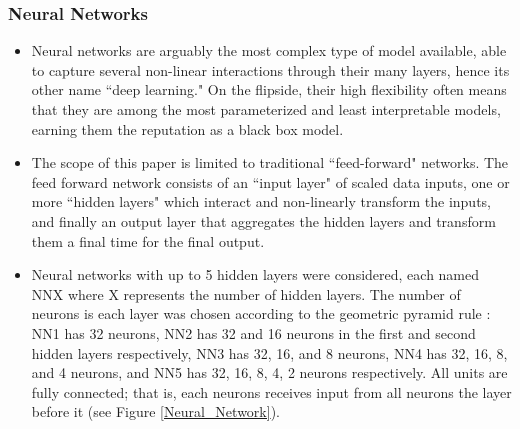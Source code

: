 \documentclass{beamer}
\begin{document}
\begin{frame}
\frametitle{Neural Networks}
\begin{itemize}
\item Neural networks are arguably the most complex type of model available, able to capture several non-linear interactions through their many layers, hence its other name ``deep learning." On the flipside, their high flexibility often means that they are among the most parameterized and least interpretable models, earning them the reputation as a black box model.

\item The scope of this paper is limited to traditional ``feed-forward" networks. The feed forward network consists of an ``input layer" of scaled data inputs, one or more ``hidden layers" which interact and non-linearly transform the inputs, and finally an output layer that aggregates the hidden layers and transform them a final time for the final output. 

\item Neural networks with up to 5 hidden layers were considered, each named NNX where X represents the number of hidden layers. The number of neurons is each layer was chosen according to the geometric pyramid rule \citep{masters_practical_1993}: NN1 has 32 neurons, NN2 has 32 and 16 neurons in the first and second hidden layers respectively, NN3 has 32, 16, and 8 neurons, NN4 has 32, 16, 8, and 4 neurons, and NN5 has 32, 16, 8, 4, 2 neurons respectively. All units are fully connected; that is, each neurons receives input from all neurons the layer before it (see Figure \ref{Neural_Network}).
\end{itemize}
\end{frame}
\end{document}
